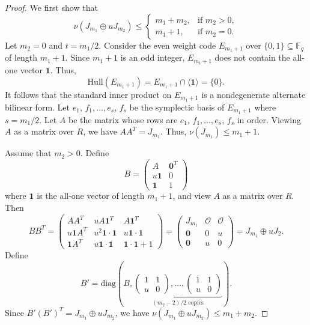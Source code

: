 \documentclass[10pt,a4paper]{amsart}
\begin{document}
\begin{proof}
We first show that
\[
\nu(J_{m_1}\oplus uJ_{m_2})\le\begin{cases}
        m_1+m_2, & \mbox{if }m_2>0,\\
        m_1+1, & \mbox{if }m_2=0.
    \end{cases}
\]
Let $m_2=0$ and $t=m_1/2$. Consider the even weight code $E_{m_1+1}$ over $\{0, 1\}\subseteq \mathbb{F}_q$ of length $m_1+1$. Since $m_1+1$ is an odd integer, $E_{m_1+1}$ does not contain the all-one vector $\mathbf{1}$. Thus,
\[
\mathrm{Hull}(E_{m_1+1})=E_{m_1+1}\cap\langle \mathbf{1}\rangle=\{0\}.
\]
It follows that the standard inner product on $E_{m_1+1}$ is a nondegenerate alternate bilinear form. Let $e_1,\, f_1, \ldots, e_s,\, f_s$ be the symplectic basis of $E_{m_1+1}$ where $s=m_1/2$. Let $A$ be the matrix whose rows are $e_1,\, f_1, \ldots, e_s,\, f_s$ in order. Viewing $A$ as a matrix over $R$, we have $AA^T=J_{m_1}$. Thus, $\nu(J_{m_1})\le m_1+1$.

Assume that $m_2>0$. Define
\[
B=\begin{pmatrix}
    A & \mathbf{0}^T\\u\mathbf{1} & 0\\\mathbf{1} & 1
\end{pmatrix}
\]
where $\mathbf{1}$ is the all-one vector of length $m_1+1$, and view $A$ as a matrix over $R$. Then
\[
BB^T=\begin{pmatrix}
    AA^T & uA\mathbf{1}^T & A\mathbf{1}^T\\u\mathbf{1}A^T & u^2\mathbf{1}\cdot\mathbf{1} & u\mathbf{1}\cdot \mathbf{1}\\\mathbf{1}A^T & u\mathbf{1}\cdot \mathbf{1} & \mathbf{1}\cdot \mathbf{1}+1
\end{pmatrix}=
\begin{pmatrix}
    J_{m_1} & \mathcal{O} & \mathcal{O}\\\mathbf{0} & 0 & u\\\mathbf{0} & u & 0
\end{pmatrix}=J_{m_1}\oplus uJ_2.
\]
Define
\[
B'=\mathrm{diag}\left(
B,\underbrace{\begin{pmatrix}
1&1\\
u&0
\end{pmatrix},
\ldots,
\begin{pmatrix}
1&1\\
u&0
\end{pmatrix}
}_{(m_2-2)/2\text{ copies}}
\right).
\]
Since $B'(B')^T=J_{m_1}\oplus uJ_{m_2}$, we have $\nu(J_{m_1}\oplus uJ_{m_2})\le m_1+m_2$.


\end{proof}
\end{document}
